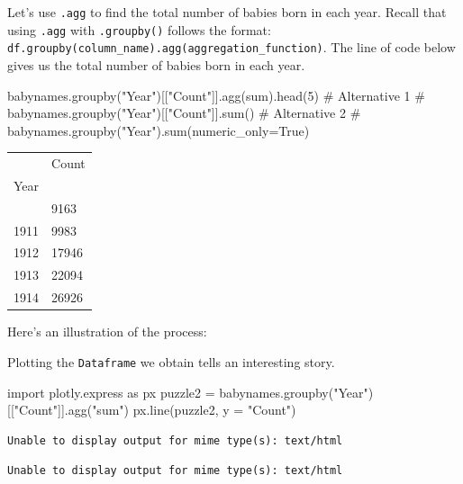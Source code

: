 \documentclass[
  letterpaper,
  DIV=11,
  numbers=noendperiod]{scrreprt}
\newenvironment{Shaded}{\begin{snugshade}}{\end{snugshade}}
\newcommand{\BuiltInTok}[1]{\textcolor[rgb]{0.00,0.23,0.31}{#1}}
\newcommand{\CommentTok}[1]{\textcolor[rgb]{0.37,0.37,0.37}{#1}}
\newcommand{\DecValTok}[1]{\textcolor[rgb]{0.68,0.00,0.00}{#1}}
\newcommand{\ImportTok}[1]{\textcolor[rgb]{0.00,0.46,0.62}{#1}}
\newcommand{\NormalTok}[1]{\textcolor[rgb]{0.00,0.23,0.31}{#1}}
\newcommand{\OperatorTok}[1]{\textcolor[rgb]{0.37,0.37,0.37}{#1}}
\newcommand{\StringTok}[1]{\textcolor[rgb]{0.13,0.47,0.30}{#1}}
\begin{document}
Let's use \texttt{.agg} to find the total number of babies born in each
year. Recall that using \texttt{.agg} with \texttt{.groupby()} follows
the format:
\texttt{df.groupby(column\_name).agg(aggregation\_function)}. The line
of code below gives us the total number of babies born in each year.

\begin{Shaded}
\begin{Highlighting}[]
\NormalTok{babynames.groupby(}\StringTok{"Year"}\NormalTok{)[[}\StringTok{"Count"}\NormalTok{]].agg(}\BuiltInTok{sum}\NormalTok{).head(}\DecValTok{5}\NormalTok{)}
\CommentTok{\# Alternative 1}
\CommentTok{\# babynames.groupby("Year")[["Count"]].sum()}
\CommentTok{\# Alternative 2}
\CommentTok{\# babynames.groupby("Year").sum(numeric\_only=True)}
\end{Highlighting}
\end{Shaded}

\begin{longtable}[]{@{}ll@{}}
\toprule\noalign{}
& Count \\
Year & \\
\midrule\noalign{}
\endhead
\bottomrule\noalign{}
\endlastfoot
1910 & 9163 \\
1911 & 9983 \\
1912 & 17946 \\
1913 & 22094 \\
1914 & 26926 \\
\end{longtable}

Here's an illustration of the process:

Plotting the \texttt{Dataframe} we obtain tells an interesting story.

\begin{Shaded}
\begin{Highlighting}[]
\ImportTok{import}\NormalTok{ plotly.express }\ImportTok{as}\NormalTok{ px}
\NormalTok{puzzle2 }\OperatorTok{=}\NormalTok{ babynames.groupby(}\StringTok{"Year"}\NormalTok{)[[}\StringTok{"Count"}\NormalTok{]].agg(}\StringTok{"sum"}\NormalTok{)}
\NormalTok{px.line(puzzle2, y }\OperatorTok{=} \StringTok{"Count"}\NormalTok{)}
\end{Highlighting}
\end{Shaded}

\begin{verbatim}
Unable to display output for mime type(s): text/html
\end{verbatim}

\begin{verbatim}
Unable to display output for mime type(s): text/html
\end{verbatim}
\end{document}
